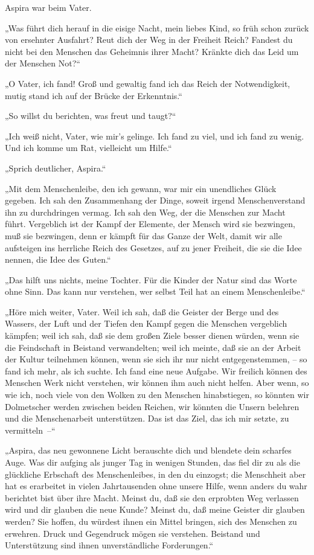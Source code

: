 Aspira war beim Vater.

„Was führt dich herauf in die eisige Nacht, mein liebes Kind, so
früh schon zurück von ersehnter Ausfahrt? Reut dich der Weg in der
Freiheit Reich? Fandest du nicht bei den Menschen das Geheimnis
ihrer Macht? Kränkte dich das Leid um der Menschen Not?“

„O Vater, ich fand! Groß und gewaltig fand ich das Reich der
Notwendigkeit, mutig stand ich auf der Brücke der Erkenntnis.“

„So willst du berichten, was freut und taugt?“

„Ich weiß nicht, Vater, wie mir's gelinge. Ich fand zu viel, und
ich fand zu wenig. Und ich komme um Rat, vielleicht um Hilfe.“

„Sprich deutlicher, Aspira.“

„Mit dem Menschenleibe, den ich gewann, war mir ein unendliches
Glück gegeben. Ich sah den Zusammenhang der Dinge, soweit irgend
Menschenverstand ihn zu durchdringen vermag. Ich sah den Weg, der
die Menschen zur Macht führt. Vergeblich ist der Kampf der
Elemente, der Mensch wird sie bezwingen, muß sie bezwingen, denn er
kämpft für das Ganze der Welt, damit wir alle aufsteigen ins
herrliche Reich des Gesetzes, auf zu jener Freiheit, die sie die
Idee nennen, die Idee des Guten.“

„Das hilft uns nichts, meine Tochter. Für die Kinder der Natur sind
das Worte ohne Sinn. Das kann nur verstehen, wer selbst Teil hat an
einem Menschenleibe.“

„Höre mich weiter, Vater. Weil ich sah, daß die Geister der Berge
und des Wassers, der Luft und der Tiefen den Kampf gegen die
Menschen vergeblich kämpfen; weil ich sah, daß sie dem großen Ziele
besser dienen würden, wenn sie die Feindschaft in Beistand
verwandelten; weil ich meinte, daß sie an der Arbeit der Kultur
teilnehmen können, wenn sie sich ihr nur nicht entgegenstemmen, –
so fand ich mehr, als ich suchte. Ich fand eine neue Aufgabe. Wir
freilich können des Menschen Werk nicht verstehen, wir können ihm
auch nicht helfen. Aber wenn, so wie ich, noch viele von den Wolken
zu den Menschen hinabstiegen, so könnten wir Dolmetscher werden
zwischen beiden Reichen, wir könnten die Unsern belehren und die
Menschenarbeit unterstützen. Das ist das Ziel, das ich mir setzte,
zu vermitteln~–“

„Aspira, das neu gewonnene Licht berauschte dich und blendete dein
scharfes Auge. Was dir aufging als junger Tag in wenigen Stunden,
das fiel dir zu als die glückliche Erbschaft des Menschenleibes, in
den du einzogst; die Menschheit aber hat es erarbeitet in vielen
Jahrtausenden ohne unsere Hilfe, wenn anders du wahr berichtet bist
über ihre Macht. Meinst du, daß sie den erprobten Weg verlassen
wird und dir glauben die neue Kunde? Meinst du, daß meine Geister
dir glauben werden? Sie hoffen, du würdest ihnen ein Mittel
bringen, sich des Menschen zu erwehren. Druck und Gegendruck mögen
sie verstehen. Beistand und Unterstützung sind ihnen
unverständliche Forderungen.“


